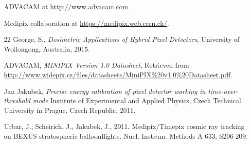 \begin{thebibliography}{00}
  ADVACAM at \url{http://www.advacam.com}

  Medipix collaboration at \url{https://medipix.web.cern.ch/}.
  
 22
  George, S., \textit{Dosimetric Applications of Hybrid Pixel Detectors}, University of Wollongong, Australia, 2015.

  ADVACAM, \textit{MINIPIX Version 1.0 Datasheet}, Retrieved from \url{http://www.widepix.cz/files/datasheets/MiniPIX\%20v1.0\%20Datasheet.pdf}.

  Jan Jakubek, \textit{Precise energy calibration of pixel detector working in time-over-threshold mode} Institute of Experimental and Applied Physics, Czech Technical University in Prague, Czech Republic, 2011.

Urbar, J., Scheirich, J., Jakubek, J., 2011. Medipix/Timepix cosmic ray tracking on BEXUS stratospheric balloonflights. Nucl. Instrum. Methods A 633, S206-209.
  
\end{thebibliography}

